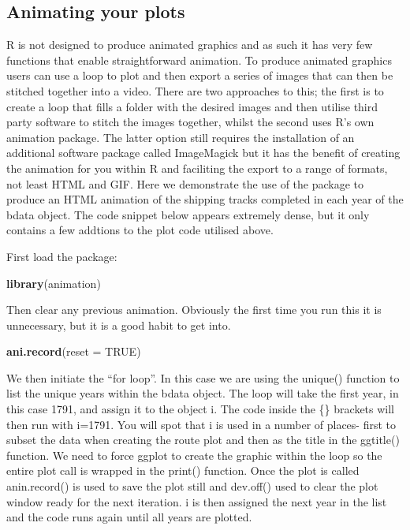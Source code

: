 \documentclass[]{article}
\newenvironment{Shaded}{}{}
\newcommand{\KeywordTok}[1]{\textcolor[rgb]{0.00,0.44,0.13}{\textbf{{#1}}}}
\newcommand{\DataTypeTok}[1]{\textcolor[rgb]{0.56,0.13,0.00}{{#1}}}
\newcommand{\OtherTok}[1]{\textcolor[rgb]{0.00,0.44,0.13}{{#1}}}
\newcommand{\NormalTok}[1]{{#1}}
\begin{document}
\subsection{Animating your plots}

R is not designed to produce animated graphics and as such it has very
few functions that enable straightforward animation. To produce animated
graphics users can use a loop to plot and then export a series of images
that can then be stitched together into a video. There are two
approaches to this; the first is to create a loop that fills a folder
with the desired images and then utilise third party software to stitch
the images together, whilst the second uses R's own animation package.
The latter option still requires the installation of an additional
software package called ImageMagick but it has the benefit of creating
the animation for you within R and faciliting the export to a range of
formats, not least HTML and GIF. Here we demonstrate the use of the
package to produce an HTML animation of the shipping tracks completed in
each year of the bdata object. The code snippet below appears extremely
dense, but it only contains a few addtions to the plot code utilised
above.

First load the package:

\begin{Shaded}
\begin{Highlighting}[]
\KeywordTok{library}\NormalTok{(animation)}
\end{Highlighting}
\end{Shaded}
Then clear any previous animation. Obviously the first time you run this
it is unnecessary, but it is a good habit to get into.

\begin{Shaded}
\begin{Highlighting}[]
\KeywordTok{ani.record}\NormalTok{(}\DataTypeTok{reset =} \OtherTok{TRUE}\NormalTok{)}
\end{Highlighting}
\end{Shaded}
We then initiate the ``for loop''. In this case we are using the
unique() function to list the unique years within the bdata object. The
loop will take the first year, in this case 1791, and assign it to the
object i. The code inside the \{\} brackets will then run with i=1791.
You will spot that i is used in a number of places- first to subset the
data when creating the route plot and then as the title in the ggtitle()
function. We need to force ggplot to create the graphic within the loop
so the entire plot call is wrapped in the print() function. Once the
plot is called anin.record() is used to save the plot still and
dev.off() used to clear the plot window ready for the next iteration. i
is then assigned the next year in the list and the code runs again until
all years are plotted.
\end{document}
